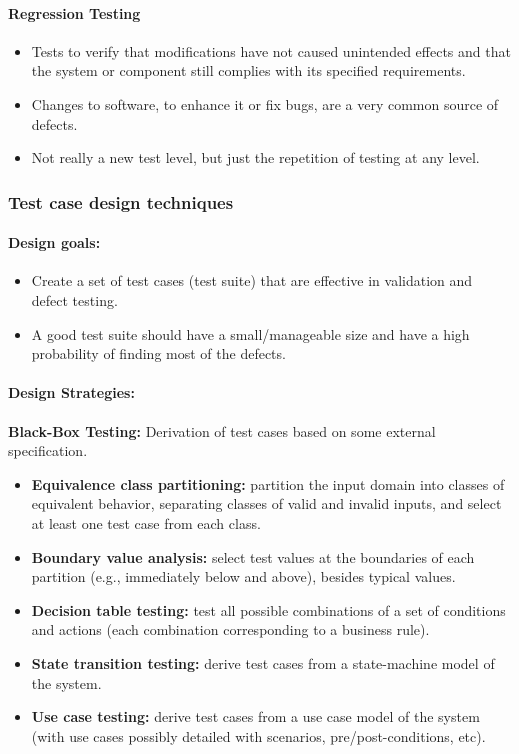 \documentclass[../ESOF_notes.tex]{subfiles}
\begin{document}
\paragraph{Regression Testing}
\begin{itemize}
    \item Tests to verify that modifications have not
          caused unintended effects and that the system or 
          component still complies with its specified requirements.
    \item Changes to software, to enhance it or fix bugs,
          are a very common source of defects.
    \item Not really a new test level, but just the repetition
          of testing at any level.
\end{itemize}
\subsubsection{Test case design techniques}
\paragraph{Design goals:}
\begin{itemize}
    \item Create a set of test cases (test suite) that are
          effective in validation and defect testing.
    \item A good test suite should have a small/manageable
          size and have a high probability of finding most of the 
          defects.
\end{itemize}
\paragraph{Design Strategies:}

\textbf{Black-Box Testing:} Derivation of test 
cases based on some external specification.
\begin{itemize}
    \item \textbf{Equivalence class partitioning:}
          partition the input domain into classes of equivalent 
          behavior, separating classes of valid and invalid 
          inputs, and select at least one test case from each
          class.
    \item \textbf{Boundary value analysis:} select test
          values at the boundaries of each partition 
          (e.g., immediately below and above), besides typical 
          values.
    \item \textbf{Decision table testing:} test all possible
          combinations of a set of conditions and actions 
          (each combination corresponding to a business rule). 
    \item \textbf{State transition testing:} derive test
          cases from a state-machine model of the system.
    \item \textbf{Use case testing:} derive test cases
          from a use case model of the system (with use cases 
          possibly detailed with scenarios, pre/post-conditions, 
          etc).
\end{itemize}
\end{document}
